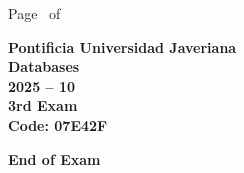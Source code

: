 \documentclass[11pt, addpoints, answers]{exam}\usepackage[utf8]{inputenc}
\begin{document}
\begin{coverpages}
\begin{center}
			\vspace{3mm}
			\leavevmode \hspace{5mm} 
		\end{center}
	\end{coverpages}

	\footer{} {Page \thepage\ of \numpages} {}

	\centering
	\textbf{\Large Pontificia Universidad Javeriana}\\
	\textbf{\Large Databases} \\
	\textbf{\large 2025 -- 10} \\
	\textbf{\large 3rd Exam} \\
	\textbf{Code: 07E42F}


	\begin{questions}
		
		
		
		
		
		
		
		
		
		
		
		
		
		
		
		
		
		
		
		
	\end{questions}

	\vspace{5mm}
	\noindent \textbf{End of Exam}
\end{document}

